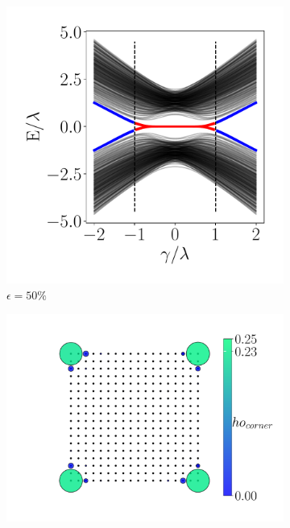 \begin{figure}[h!]
     \begin{minipage}[h!]{0.7\textwidth}
         \begin{subfigure}[b!]{0.44 \textwidth}
             \caption{$\epsilon = 50\%$}
             \includegraphics[width=\textwidth]{Imagenes/Resultados_Hoti_Cuadrado/bands_square_shh_0.5.pdf}
         \end{subfigure}\hspace*{-0.5em}
         \begin{subfigure}[b!]{0.56 \textwidth}
             \caption*{}
             \includegraphics[width=\textwidth]{Imagenes/Resultados_Hoti_Cuadrado/proyection_square_0.5.pdf}

\end{subfigure}
\end{minipage}
\end{figure}
